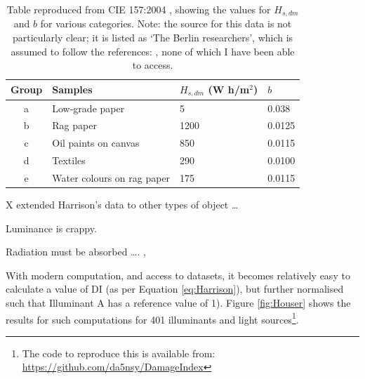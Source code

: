 \begin{table}[htbp]
\centering
\begin{tabular}{|c|l|l|l|}
\hline
Group & Samples & $H_{s,dm}$ (W h/m$^{2}$) & $b$ \\ \hline
a & Low-grade paper & 5 & 0.038 \\ \hline
b & Rag paper & 1200 & 0.0125 \\ \hline
c & Oil paints on canvas & 850 & 0.0115 \\ \hline
d & Textiles & 290 & 0.0100 \\ \hline
e & Water colours on rag paper & 175 & 0.0115 \\ \hline
\end{tabular}
\caption{Table reproduced from CIE 157:2004 \citep{cie_cie_2004}, showing the values for $H_{s,dm}$ and $b$ for various categories. Note: the source for this data is not particularly clear; it is listed as `The Berlin researchers', which is assumed to follow the references: \citet{krochmann_beleuchtung_1988,cie_cie_1991,hilbert_zur_1991}, none of which I have been able to access.}
\label{tab:b}
\end{table}



\noindent
X extended Harrison's data to other types of object \dots

\noindent
Luminance is crappy.


\noindent
Radiation must be absorbed \dots \citet{durmus_optimising_2017,durmus_colour_2015,durmus_optimising_2015,durmus_object_2017}. \citet{saunders_wavelength-dependent_1994}, \citet{villmann_wavelength_2018}

With modern computation, and access to datasets, it becomes relatively easy to calculate a value of \Gls{DI} (as per Equation \ref{eq:Harrison}), but further normalised such that Illuminant A has a reference value of 1). Figure \ref{fig:Houser} shows the results for such computations for 401 illuminants and light sources\footnote{The code to reproduce this is available from: \url{https://github.com/da5nsy/DamageIndex}}.

